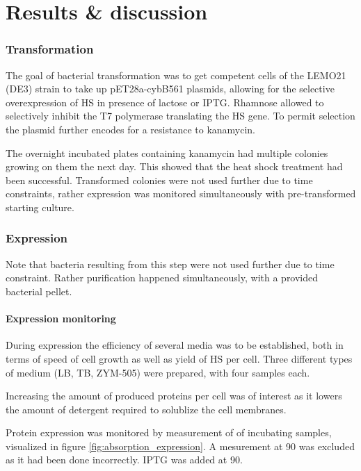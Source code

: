 \twocolumn


\part{Results \& discussion}

\section{Transformation}

The goal of bacterial transformation was to get competent \ecoli{} cells of the
LEMO21 (DE3) strain to take up pET28a-cybB561 plasmids, allowing for the
selective overexpression of HS in presence of lactose or IPTG. Rhamnose allowed
to selectively inhibit the T7 polymerase translating the HS gene.
\cite{memstar} To permit selection the plasmid further encodes for a resistance
to kanamycin.

The overnight incubated plates containing kanamycin had multiple colonies
growing on them the next day. This showed that the heat shock treatment had
been successful. Transformed colonies were not used further due to time
constraints, rather expression was monitored simultaneously with
pre-transformed starting culture.

\section{Expression}

Note that bacteria resulting from this step were not used further due to time
constraint. Rather purification happened simultaneously, with a provided
bacterial pellet.

\subsection{Expression monitoring}

During expression the efficiency of several media was to be established, both
in terms of speed of cell growth as well as yield of HS per cell. Three
different types of medium (LB, TB, ZYM-505) were prepared, with four samples
each.

Increasing the amount of produced proteins per cell was of interest as it
lowers the amount of detergent required to solublize the cell membranes.

Protein expression was monitored by measurement of \odbact of incubating
samples, visualized in figure \ref{fig:absorption_expression}. A mesurement at
\SI{90}{\min} was excluded as it had been done incorrectly. IPTG was added at
\SI{90}{\min}.

